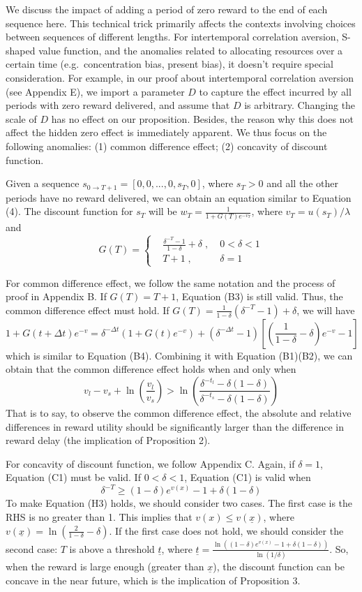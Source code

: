 \documentclass[
  12pt,
]{article}
\begin{document}
We discuss the impact of adding a period of zero reward to the end of
each sequence here. This technical trick primarily affects the contexts
involving choices between sequences of different lengths. For
intertemporal correlation aversion, S-shaped value function, and the
anomalies related to allocating resources over a certain time
(e.g.~concentration bias, present bias), it doesn't require special
consideration. For example, in our proof about intertemporal correlation
aversion (see Appendix E), we import a parameter \(D\) to capture the
effect incurred by all periods with zero reward delivered, and assume
that \(D\) is arbitrary. Changing the scale of \(D\) has no effect on
our proposition. Besides, the reason why this does not affect the hidden
zero effect is immediately apparent. We thus focus on the following
anomalies: (1) common difference effect; (2) concavity of discount
function.

Given a sequence \(s_{0\rightarrow T+1}=[0,0,...,0,s_T,0]\), where
\(s_T>0\) and all the other periods have no reward delivered, we can
obtain an equation similar to Equation (4). The discount function for
\(s_T\) will be \(w_T=\frac{1}{1+G(T)e^{-v_T}}\), where
\(v_T=u(s_T)/\lambda\) and \[\tag{H1}
G(T)=\left\{
\begin{aligned}
& \frac{\delta^{-T}-1}{1-\delta}+\delta \;,&\; 0<\delta<1 \\
& T+1 \;,&\; \delta=1
\end{aligned}
\right.
\]

For common difference effect, we follow the same notation and the
process of proof in Appendix B. If \(G(T)=T+1\), Equation (B3) is still
valid. Thus, the common difference effect must hold. If
\(G(T)=\frac{1}{1-\delta}(\delta^{-T}-1)+\delta\), we will
have\[\tag{H2}
1+G(t+\Delta t)e^{-v}=
\delta^{-\Delta t}(1+G(t)e^{-v})+(\delta^{-\Delta t}-1)[(\frac{1}{1-\delta}-\delta)e^{-v}-1]
\]which is similar to Equation (B4). Combining it with Equation
(B1)(B2), we can obtain that the common difference effect holds when and
only when\[
v_l-v_s+\ln\left(\frac{v_l}{v_s}\right)>
\ln\left(\frac{\delta^{-t_l}-\delta(1-\delta)}{\delta^{-t_s}-\delta(1-\delta)}\right)
\]That is to say, to observe the common difference effect, the absolute
and relative differences in reward utility should be significantly
larger than the difference in reward delay (the implication of
Proposition 2).

For concavity of discount function, we follow Appendix C. Again, if
\(\delta=1\), Equation (C1) must be valid. If \(0<\delta<1\), Equation
(C1) is valid when\[\tag{H3}
\delta^{-T}\geq (1-\delta)e^{v(x)}-1+\delta(1-\delta)
\]To make Equation (H3) holds, we should consider two cases. The first
case is the RHS is no greater than 1. This implies that
\(v(x)\leq v(\underline{x})\), where
\(v(\underline{x})=\ln(\frac{2}{1-\delta}-\delta)\). If the first case
does not hold, we should consider the second case: \(T\) is above a
threshold \(\underline{t}\), where
\(\underline{t}=\frac{\ln((1-\delta)e^{v(x)}-1+\delta(1-\delta))}{\ln(1/\delta)}\).
So, when the reward is large enough (greater than \(\underline{x}\)),
the discount function can be concave in the near future, which is the
implication of Proposition 3.
\end{document}
